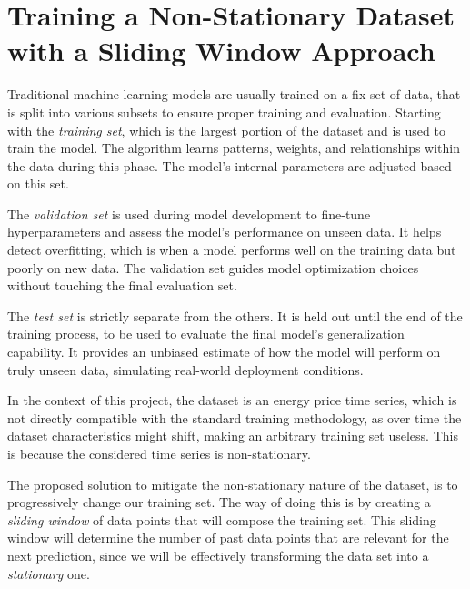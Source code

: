 \documentclass[12pt]{report} %
\begin{document}
\section{Training a Non-Stationary Dataset with a Sliding Window Approach}

Traditional machine learning models are usually trained on a fix set of data, that is split into various subsets to ensure proper training and evaluation. Starting with the \textit{training set}, which is the largest portion of the dataset and is used to train the model. The algorithm learns patterns, weights, and relationships within the data during this phase. The model’s internal parameters are adjusted based on this set.

The \textit{validation set} is used during model development to fine-tune hyperparameters and assess the model’s performance on unseen data. It helps detect overfitting, which is when a model performs well on the training data but poorly on new data. The validation set guides model optimization choices without touching the final evaluation set.

The \textit{test set} is strictly separate from the others. It is held out until the end of the training process, to be used to evaluate the final model’s generalization capability. It provides an unbiased estimate of how the model will perform on truly unseen data, simulating real-world deployment conditions.

In the context of this project, the dataset is an energy price time series, which is not directly compatible with the standard training methodology, as over time the dataset characteristics might shift, making an arbitrary training set useless. This is because the considered time series is \textit{}{non-stationary}.

The proposed solution to mitigate the \textit{}{non-stationary} nature of the dataset, is to progressively change our training set. The way of doing this is by creating a \textit{sliding window} of data points that will compose the training set. This sliding window will determine the number of past data points that are relevant for the next prediction, since we will be effectively transforming the data set into a \textit{stationary} one.
\end{document}
